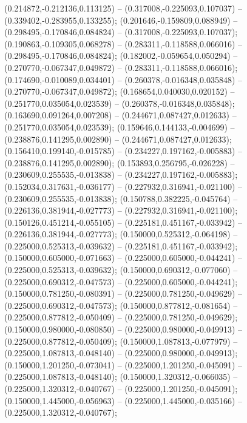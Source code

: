  (0.214872,-0.212136,0.113125) -- (0.317008,-0.225093,0.107037) -- (0.339402,-0.283955,0.133255);
 (0.201646,-0.159809,0.088949) -- (0.298495,-0.170846,0.084824) -- (0.317008,-0.225093,0.107037);
 (0.190863,-0.109305,0.068278) -- (0.283311,-0.118588,0.066016) -- (0.298495,-0.170846,0.084824);
 (0.182002,-0.059654,0.050294) -- (0.270770,-0.067347,0.049872) -- (0.283311,-0.118588,0.066016);
 (0.174690,-0.010089,0.034401) -- (0.260378,-0.016348,0.035848) -- (0.270770,-0.067347,0.049872);
 (0.168654,0.040030,0.020152) -- (0.251770,0.035054,0.023539) -- (0.260378,-0.016348,0.035848);
 (0.163690,0.091264,0.007208) -- (0.244671,0.087427,0.012633) -- (0.251770,0.035054,0.023539);
 (0.159646,0.144133,-0.004699) -- (0.238876,0.141295,0.002890) -- (0.244671,0.087427,0.012633);
 (0.156410,0.199140,-0.015785) -- (0.234227,0.197162,-0.005883) -- (0.238876,0.141295,0.002890);
 (0.153893,0.256795,-0.026228) -- (0.230609,0.255535,-0.013838) -- (0.234227,0.197162,-0.005883);
 (0.152034,0.317631,-0.036177) -- (0.227932,0.316941,-0.021100) -- (0.230609,0.255535,-0.013838);
 (0.150788,0.382225,-0.045764) -- (0.226136,0.381944,-0.027773) -- (0.227932,0.316941,-0.021100);
 (0.150126,0.451214,-0.055105) -- (0.225181,0.451167,-0.033942) -- (0.226136,0.381944,-0.027773);
 (0.150000,0.525312,-0.064198) -- (0.225000,0.525313,-0.039632) -- (0.225181,0.451167,-0.033942);
 (0.150000,0.605000,-0.071663) -- (0.225000,0.605000,-0.044241) -- (0.225000,0.525313,-0.039632);
 (0.150000,0.690312,-0.077060) -- (0.225000,0.690312,-0.047573) -- (0.225000,0.605000,-0.044241);
 (0.150000,0.781250,-0.080391) -- (0.225000,0.781250,-0.049629) -- (0.225000,0.690312,-0.047573);
 (0.150000,0.877812,-0.081654) -- (0.225000,0.877812,-0.050409) -- (0.225000,0.781250,-0.049629);
 (0.150000,0.980000,-0.080850) -- (0.225000,0.980000,-0.049913) -- (0.225000,0.877812,-0.050409);
 (0.150000,1.087813,-0.077979) -- (0.225000,1.087813,-0.048140) -- (0.225000,0.980000,-0.049913);
 (0.150000,1.201250,-0.073041) -- (0.225000,1.201250,-0.045091) -- (0.225000,1.087813,-0.048140);
 (0.150000,1.320312,-0.066035) -- (0.225000,1.320312,-0.040767) -- (0.225000,1.201250,-0.045091);
 (0.150000,1.445000,-0.056963) -- (0.225000,1.445000,-0.035166) -- (0.225000,1.320312,-0.040767);
